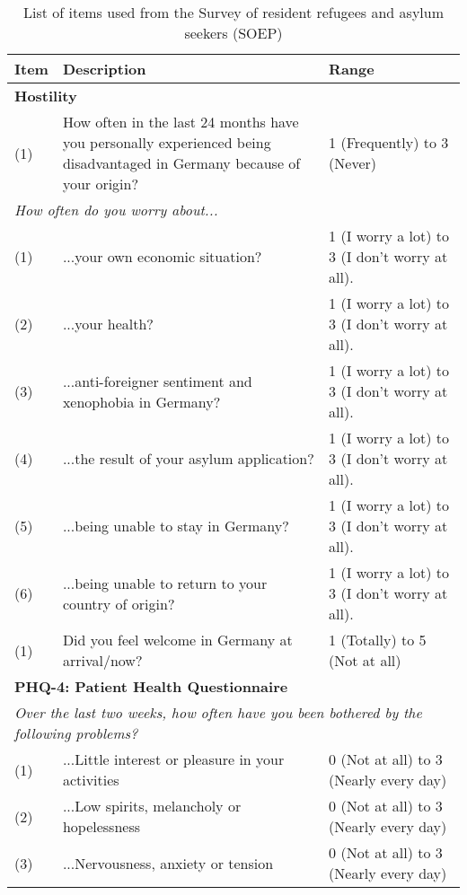 \begin{table}[H]
\centering
\caption{List of items used from the Survey of resident refugees and asylum seekers (SOEP)}
\label{tab:items_allbus}
\begin{tabular}{p{0.5cm}p{8cm}p{4cm}} \toprule
Item & Description & Range \\ \midrule
\multicolumn{3}{l}{\textbf{Hostility}}  \vspace{0.2cm} \\
 (1) & How often in the last 24 months have you personally experienced being disadvantaged in Germany because of your origin? & 1 (Frequently) to 3 (Never) \vspace{0.2cm} \\
 \multicolumn{3}{l}{\textit{How often do you worry about...}} \\
 (1) & ...your own economic situation? &  1 (I worry a lot) to 3 (I don't worry at all).\\
 (2) & ...your health? &  1 (I worry a lot) to 3 (I don't worry at all).\\
 (3) & ...anti-foreigner sentiment and xenophobia in Germany? &  1 (I worry a lot) to 3 (I don't worry at all).\\ 
 (4) & ...the result of your asylum application? &  1 (I worry a lot) to 3 (I don't worry at all).\\ 
 (5) & ...being unable to stay in Germany? &  1 (I worry a lot) to 3 (I don't worry at all).\\ 
 (6) & ...being unable to return to your country of origin? &  1 (I worry a lot) to 3 (I don't worry at all).\\ 
  (1) & Did you feel welcome in Germany at arrival/now? & 1 (Totally) to 5 (Not at all) \\ \midrule
\multicolumn{3}{l}{\textbf{PHQ-4: Patient Health Questionnaire}}  \vspace{0.2cm} \\
\multicolumn{3}{l}{\textit{Over the last two weeks, how often have you been bothered by the following problems?}}  \\
 (1) & ...Little interest or pleasure in your activities & 0 (Not at all) to 3 (Nearly every day)\\
 (2) & ...Low spirits, melancholy or hopelessness & 0 (Not at all) to 3 (Nearly every day)\\
 (3) & ...Nervousness, anxiety or tension & 0 (Not at all) to 3 (Nearly every day)\\

\end{tabular}
\end{table}
